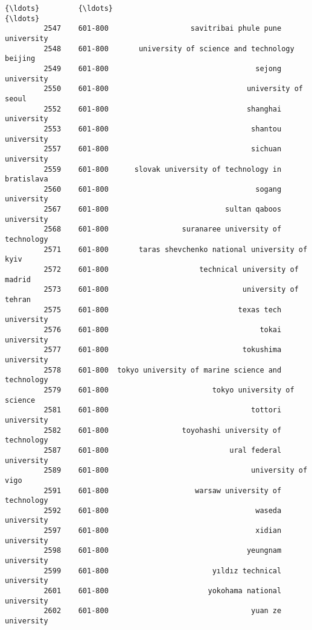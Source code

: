 \documentclass[11pt]{article}
\begin{document}
\begin{Verbatim}[commandchars=\\\{\}]
         {\ldots}         {\ldots}                                                {\ldots}   
         2547    601-800                   savitribai phule pune university   
         2548    601-800       university of science and technology beijing   
         2549    601-800                                  sejong university   
         2550    601-800                                university of seoul   
         2552    601-800                                shanghai university   
         2553    601-800                                 shantou university   
         2557    601-800                                 sichuan university   
         2559    601-800      slovak university of technology in bratislava   
         2560    601-800                                  sogang university   
         2567    601-800                           sultan qaboos university   
         2568    601-800                 suranaree university of technology   
         2571    601-800       taras shevchenko national university of kyiv   
         2572    601-800                     technical university of madrid   
         2573    601-800                               university of tehran   
         2575    601-800                              texas tech university   
         2576    601-800                                   tokai university   
         2577    601-800                               tokushima university   
         2578    601-800  tokyo university of marine science and technology   
         2579    601-800                        tokyo university of science   
         2581    601-800                                 tottori university   
         2582    601-800                 toyohashi university of technology   
         2587    601-800                            ural federal university   
         2589    601-800                                 university of vigo   
         2591    601-800                    warsaw university of technology   
         2592    601-800                                  waseda university   
         2597    601-800                                  xidian university   
         2598    601-800                                yeungnam university   
         2599    601-800                        yıldız technical university   
         2601    601-800                       yokohama national university   
         2602    601-800                                 yuan ze university   
         

\end{Verbatim}
\end{document}
